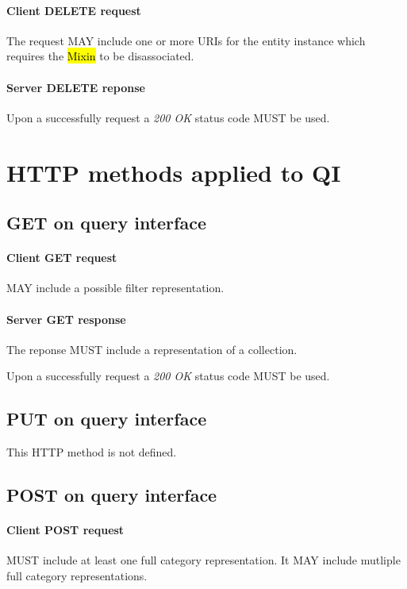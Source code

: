 \documentclass[10pt,a4paper]{article}
\begin{document}
\paragraph{Client DELETE request}
The request MAY include one or more URIs for the entity instance which requires the \hl{Mixin} to be disassociated.

\paragraph{Server DELETE reponse}
Upon a successfully request a \emph{200 OK} status code MUST be used.

\section{HTTP methods applied to QI}

\subsection{GET on query interface}

\paragraph{Client GET request}
MAY include a possible filter representation.

\paragraph{Server GET response}
The reponse MUST include a representation of a collection.

Upon a successfully request a \emph{200 OK} status code MUST be used.

\subsection{PUT on query interface}

This HTTP method is not defined.

\subsection{POST on query interface}

\paragraph{Client POST request}
MUST include at least one full category representation. It MAY include mutliple full category representations.
\end{document}
